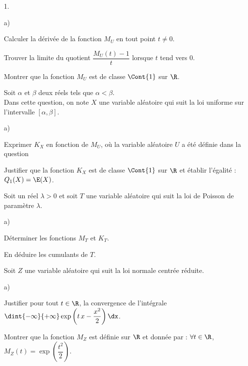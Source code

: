 \documentclass[11pt]{article}%
\begin{document}
\begin{noliste}{1.}
\begin{noliste}{a)}
  \item Calculer la dérivée de la fonction $M_U$ en tout point $t \neq
    0$.
    
  \item Trouver la limite du quotient $\dfrac{M_U(t) -1}{t}$ lorsque
    $t$ tend vers $0$.
    
  \item Montrer que la fonction $M_U$ est de classe $\Cont{1}$ sur $\R$.
  \end{noliste}


  
  
\item Soit $\alpha$ et $\beta$ deux réels tels que $\alpha < \beta$.\\
  Dans cette question, on note $X$ une variable aléatoire qui suit la
  loi uniforme sur l'intervalle $[\alpha, \beta]$.
  \begin{noliste}{a)}
    \setlength{\itemsep}{2mm}
  \item Exprimer $K_X$ en fonction de $M_U$, où la variable aléatoire
    $U$ a été définie dans la question 
    
  \item Justifier que la fonction $K_X$ est de classe $\Cont{1}$ sur
    $\R$ et établir l'égalité : $Q_1(X) = \E(X)$.
  \end{noliste}
  
\item Soit un réel $\lambda >0$ et soit $T$ une variable aléatoire qui
  suit la loi de Poisson de paramètre $\lambda$.
  \begin{noliste}{a)}
    \setlength{\itemsep}{2mm}
  \item Déterminer les fonctions $M_T$ et $K_T$.
    
  \item En déduire les cumulants de $T$.
  \end{noliste}
  
\item Soit $Z$ une variable aléatoire qui suit la loi normale centrée
  réduite.
  \begin{noliste}{a)}
    \setlength{\itemsep}{2mm}
  \item Justifier pour tout $t \in \R$, la convergence de l'intégrale
    $\dint{-\infty}{+\infty} \exp\left(t \, x - \dfrac{x^2}{2}\right)
    \dx$.
    
  \item Montrer que la fonction $M_Z$ est définie sur $\R$ et donnée
    par : $\forall t \in \R$, $M_Z(t) =
    \exp\left(\dfrac{t^2}{2}\right)$.
    

\end{noliste}
\end{noliste}
\end{document}
